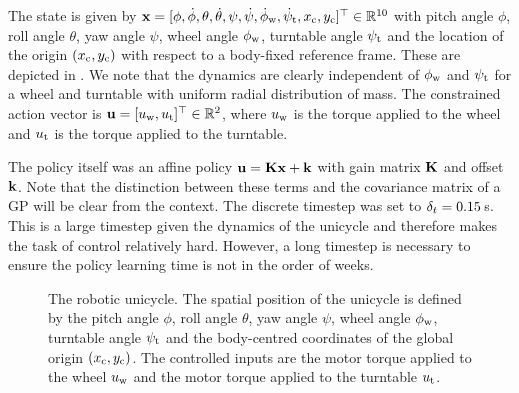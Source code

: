 The state is given by $\mathbf{x} = [\phi, \dot\phi, \theta, \dot\theta, \psi, \dot\psi, \dot\phi_{\text{w}}, \dot\psi_\text{t},x_\text{c}, y_\text{c}]^\top \in \mathbb{R}^{10}$ with pitch angle $\phi$, roll angle $\theta$, yaw angle $\psi$, wheel angle $\phi_{\text{w}}$, turntable angle $\psi_{\text{t}}$ and the location of the origin $(x_{\text{c}},y_{\text{c}})$ with respect to a body-fixed reference frame. These are depicted in . We note that the dynamics are clearly independent of $\phi_{\text{w}}$ and $\psi_{\text{t}}$ for a wheel and turntable with uniform radial distribution of mass.  The constrained action vector is $\mathbf{u} = [u_{\text{w}}, u_{\text{t}}]^\top \in \mathbb{R}^2$, where $u_{\text{w}}$ is the torque applied to the wheel and $u_{\text{t}}$ is the torque applied to the turntable.

The policy itself was an affine policy $\mathbf{u} = \mathbf{K}\mathbf{x} + \mathbf{k}$ with gain matrix $\mathbf{K}$ and offset $\mathbf{k}$. Note that the distinction between these terms and the covariance matrix of a GP will be clear from the context. The discrete timestep was set to $\delta_t = 0.15\,$s. This is a large timestep given the dynamics of the unicycle and therefore makes the task of control relatively hard. However, a long timestep is necessary to ensure the policy learning time is not in the order of weeks.


\begin{figure}
\centering

\caption{The robotic unicycle. The spatial position of the unicycle is defined by the pitch angle $\phi$, roll angle $\theta$, yaw angle $\psi$, wheel angle $\phi_{\text{w}}$, turntable angle $\psi_{\text{t}}$ and the body-centred coordinates of the global origin $(x_{\text{c}},y_{\text{c}})$. The controlled inputs are the motor torque applied to the wheel $u_{\text{w}}$ and the motor torque applied to the turntable $u_{\text{t}}$.}
\label{fig:unicycle}
\end{figure}




